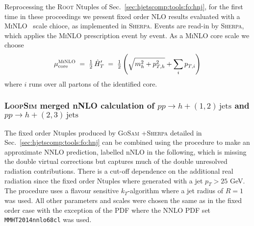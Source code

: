 Reprocessing the \textsc{Root} Ntuples of Sec.\ 
\ref{sec:hjetscomp:tools:fo:hnj}, for the first time in these 
proceedings we present fixed order NLO results evaluated with a
\textsc{MiNLO}~\cite{Hamilton:2012np} scale chioce, as implemented in
\textsc{Sherpa}. Events are read-in by \textsc{Sherpa}, which applies
the \textsc{MiNLO} prescription event by event. As a \textsc{MiNLO}
core scale we choose
\begin{equation} \label{eq:hthatprime}
  \mu_\text{core}^\text{\textsc{MiNLO}}
  \;=\;\tfrac{1}{2}\,\hat{H}^\prime_T
  \;=\;\tfrac{1}{2}\left(\sqrt{m_h^{2}+p_{T,h}^{2}}
       +\sum_{i}p_{T,i}^{}\right)\,
\end{equation}
where $i$ runs over all partons of the identified core.

\subsubsection{\textsc{LoopSim} merged nNLO calculation of 
               $pp\to h+(1,2)\,\text{jets}$ and $pp\to h+(2,3)\,\text{jets}$}
\label{sec:hjetscomp:tools:fo:hnjloopsim}

The fixed order Ntuples produced by \textsc{GoSam}{} +\textsc{Sherpa} 
detailed in Sec.\ \ref{sec:hjetscomp:tools:fo:hnj} can be combined 
using the \Loopsim \cite{Rubin:2010xp} procedure to make an approximate 
NNLO prediction, labelled nNLO in the following, which is missing the 
double virtual corrections but captures much of the double unresolved 
radiation contributions. There is a cut-off dependence on the additional 
real radiation since the fixed order Ntuples where generated with a jet 
$p_T>25$ GeV. The \Loopsim procedure uses a flavour sensitive 
$k_T$-algorithm where a jet radius of $R=1$ was used. All other 
parameters and scales were chosen the same as in the fixed order case 
with the exception of the PDF where the NNLO PDF set 
\texttt{MMHT2014nnlo68cl} was used.

